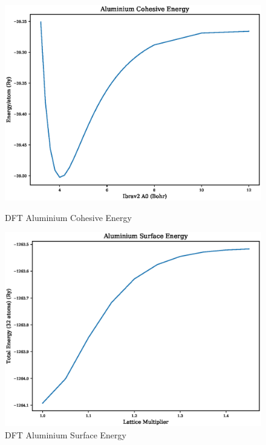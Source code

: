 \begin{figure}[h]
\begin{minipage}[b]{0.48\linewidth}
  \begin{center}
    \includegraphics[width=.98\linewidth]{chapters/future_work/plots/al_cohesive_energy.eps}
    \caption{DFT Aluminium Cohesive Energy}
    \label{fig:dftaluminiumcohesive}
  \end{center}
\end{minipage}
\begin{minipage}[b]{0.48\linewidth}
  \begin{center}
    \includegraphics[width=.98\linewidth]{chapters/future_work/plots/al_surface_energy.eps}
    \caption{DFT Aluminium Surface Energy}
    \label{fig:dftaluminiumsurface}
  \end{center}
\end{minipage}
\end{figure}


